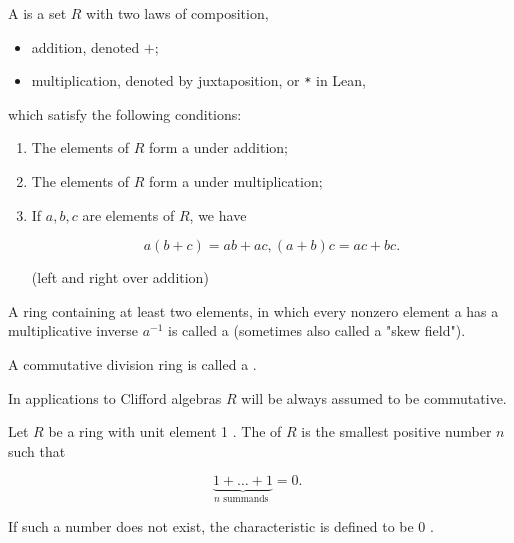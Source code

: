 \begin{definition}[Ring]
    \label{ring}

    A  is a set $R$ with two laws of composition, 
    
    \begin{itemize}
        
    \item addition, denoted $+$;
    \item multiplication, denoted by juxtaposition, or \texttt{*} in Lean,
    
    \end{itemize}
    
    which satisfy the following conditions:

    \begin{enumerate}
    \item The elements of $R$ form a  under addition;

    \item The elements of $R$ form a  under multiplication;

    \item If $a, b, c$ are elements of $R$, we have

    $$
    a (b + c) = a b + a c, (a + b) c = a c + b c.
    $$

    (left and right  over addition)

    \end{enumerate}



\end{definition}

\begin{remark}
    \label{mk:ring}
    
    A ring containing at least two elements, in which every nonzero element a has a multiplicative inverse $a^{-1}$ is called a  (sometimes also called a "skew field").
    
    A commutative division ring is called a .

    In applications to Clifford algebras $R$ will be always assumed to be commutative.
    
\end{remark}

\begin{definition}[Characteristic]
    \label{characteristic}

    Let $R$ be a ring with unit element 1 . The  of $R$ is the smallest positive number $n$ such that

    $$
    \underbrace{1+\ldots+1}_{n \text { summands }}=0 \text {. }
    $$
    
    If such a number does not exist, the characteristic is defined to be 0 .

\end{definition}